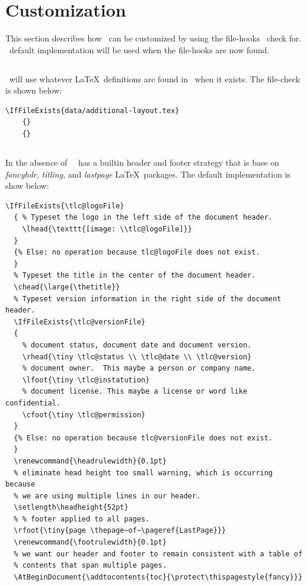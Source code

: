 \documentclass[12pt]{tlc-article}
\begin{document}

\clearpage
\section{Customization}
This section describes how \tlcA\ can be customized by using the file-hooks
\tlcA\ check for.  \tlcA\ default implementation will be used when the
file-hooks are now found.


\subsection{\tlcAL}
\tlcA\ will use whatever \LaTeX\ definitions are found in \tlcAL\ when it
exists.  The file-check is shown
below:

\begin{lstlisting}[basicstyle=\tiny]
  \IfFileExists{data/additional-layout.tex}
    {}
    {}
\end{lstlisting}


\subsection{\tlcHF}
In the absence of \tlcAL\, \tlcA\ has a builtin header and footer strategy that
is base on \textit{fancyhdr}, \textit{titling}, and \textit{lastpage} \LaTeX\
packages. The default implementation is show below:

\begin{lstlisting}[basicstyle=\tiny]
  \IfFileExists{\tlc@logoFile}
  { % Typeset the logo in the left side of the document header.
    \lhead{\texttt{[image: \\tlc@logoFile]}}
  }
  {% Else: no operation because tlc@logoFile does not exist.
  }
  % Typeset the title in the center of the document header.
  \chead{\large{\thetitle}}
  % Typeset version information in the right side of the document header.
  \IfFileExists{\tlc@versionFile}
  {
    % document status, document date and document version.
    \rhead{\tiny \tlc@status \\ \tlc@date \\ \tlc@version}
    % document owner.  This maybe a person or company name.
    \lfoot{\tiny \tlc@instatution}
    % document license. This maybe a license or word like confidential.
    \cfoot{\tiny \tlc@permission}
  }
  {% Else: no operation because tlc@versionFile does not exist.
  }
  \renewcommand{\headrulewidth}{0.1pt}
  % eliminate head height too small warning, which is occurring because
  % we are using multiple lines in our header.
  \setlength\headheight{52pt}
  % % footer applied to all pages.
  \rfoot{\tiny{page \thepage~of~\pageref{LastPage}}}
  \renewcommand{\footrulewidth}{0.1pt}
  % we want our header and footer to remain consistent with a table of
  % contents that span multiple pages.
  \AtBeginDocument{\addtocontents{toc}{\protect\thispagestyle{fancy}}}
\end{lstlisting}
\end{document}
